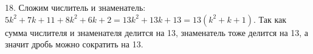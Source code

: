 18. Сложим числитель и знаменатель: $5k^2+7k+11+8k^2+6k+2=13k^2+13k+13=13(k^2+k+1).$ Так как сумма числителя и знаменателя делится на 13, знаменатель тоже делится на 13, а значит дробь можно сократить на 13.\\
